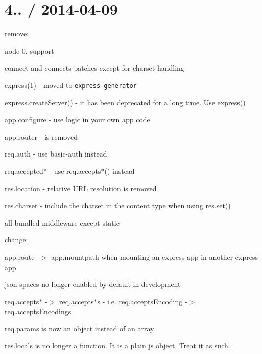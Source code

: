 {\ttfamily \section*{4.. / 2014-\/04-\/09 }}

{\ttfamily }

{\ttfamily 
\begin{DoxyItemize}
\item remove\+:
\begin{DoxyItemize}
\item node 0. support
\item connect and connect\textquotesingle{}s patches except for charset handling
\item express(1) -\/ moved to \href{https://github.com/expressjs/generator}{\tt express-\/generator}
\item {\ttfamily express.\+create\+Server()} -\/ it has been deprecated for a long time. Use {\ttfamily express()}
\item {\ttfamily app.\+configure} -\/ use logic in your own app code
\item {\ttfamily app.\+router} -\/ is removed
\item {\ttfamily req.\+auth} -\/ use {\ttfamily basic-\/auth} instead
\item {\ttfamily req.\+accepted$\ast$} -\/ use {\ttfamily req.\+accepts$\ast$()} instead
\item {\ttfamily res.\+location} -\/ relative \mbox{\hyperlink{namespace_u_r_l}{U\+RL}} resolution is removed
\item {\ttfamily res.\+charset} -\/ include the charset in the content type when using {\ttfamily res.\+set()}
\item all bundled middleware except {\ttfamily static}
\end{DoxyItemize}
\item change\+:
\begin{DoxyItemize}
\item {\ttfamily app.\+route} -\/$>$ {\ttfamily app.\+mountpath} when mounting an express app in another express app
\item {\ttfamily json spaces} no longer enabled by default in development
\item {\ttfamily req.\+accepts$\ast$} -\/$>$ {\ttfamily req.\+accepts$\ast$s} -\/ i.\+e. {\ttfamily req.\+accepts\+Encoding} -\/$>$ {\ttfamily req.\+accepts\+Encodings}
\item {\ttfamily req.\+params} is now an object instead of an array
\item {\ttfamily res.\+locals} is no longer a function. It is a plain js object. Treat it as such.

\end{DoxyItemize}
\end{DoxyItemize}}

